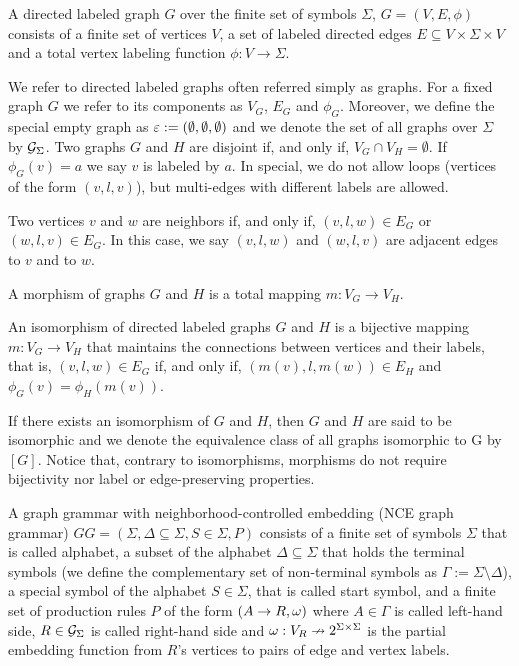 \documentclass[runningheads]{llncs}
\begin{document}
\begin{definition}
	\label{def:graph}
	A directed labeled graph $G$ over the finite set of symbols $\Sigma$, $G = (V, E, \phi)$ consists of a finite set of vertices $V$, a set of labeled directed edges $E \subseteq V \times \Sigma \times V$ and a total vertex labeling function $\phi : V \to \Sigma$. 
\end{definition}

We refer to directed labeled graphs often referred simply as graphs. For a fixed graph $G$ we refer to its components as $V_G$, $E_G$ and $\phi_G$. Moreover, we define the special empty graph as $\varepsilon := (\emptyset, \emptyset, \emptyset)$ and we denote the set of all graphs over $\Sigma$ by $\mathcal{G}_{\Sigma}$. Two graphs $G$ and $H$ are disjoint if, and only if, $V_G \cap V_H = \emptyset$. If $\phi_G(v) = a$ we say $v$ is labeled by $a$. In special, we do not allow loops (vertices of the form $(v,l,v)$), but multi-edges with different labels are allowed.

Two vertices $v$ and $w$ are neighbors if, and only if, $(v,l,w) \in E_G$ or $(w,l,v) \in E_G$. In this case, we say $(v,l,w)$ and $(w,l,v)$ are adjacent edges to $v$ and to $w$.

\begin{definition}
	\label{def:morphism}
	A morphism of graphs $G$ and $H$ is a total mapping $m: V_G \to V_H$.
\end{definition}

\begin{definition}
	An isomorphism of directed labeled graphs $G$ and $H$ is a bijective mapping $m: V_G \to V_H$ that maintains the connections between vertices and their labels, that is, $(v,l,w) \in E_G$ if, and only if, $(m(v),l,m(w)) \in E_H$ and $\phi_G(v) = \phi_H(m(v))$.
\end{definition}

If there exists an isomorphism of $G$ and $H$, then $G$ and $H$ are said to be isomorphic and we denote the equivalence class of all graphs isomorphic to G by $[G]$. Notice that, contrary to isomorphisms, morphisms do not require bijectivity nor label or edge-preserving properties.

\begin{definition}
	\label{def:gg}
	A graph grammar with neighborhood-controlled embedding (NCE graph grammar) $GG = (\Sigma, \Delta \subseteq \Sigma, S \in \Sigma, P)$ consists of a finite set of symbols $\Sigma$ that is called alphabet, a subset of the alphabet $\Delta \subseteq \Sigma$ that holds the terminal symbols (we define the complementary set of non-terminal symbols as $\Gamma := \Sigma \setminus \Delta$), a special symbol of the alphabet $S \in \Sigma$, that is called start symbol, and a finite set of production rules $P$ of the form $(A \to R, \omega)$ where $A \in \Gamma$ is called left-hand side, $R \in \mathcal{G}_{\Sigma}$ is called right-hand side and $\omega : V_R \nrightarrow 2^{\Sigma \times \Sigma}$ is the partial embedding function from $R$'s vertices to pairs of edge and vertex labels.
\end{definition}
\end{document}

